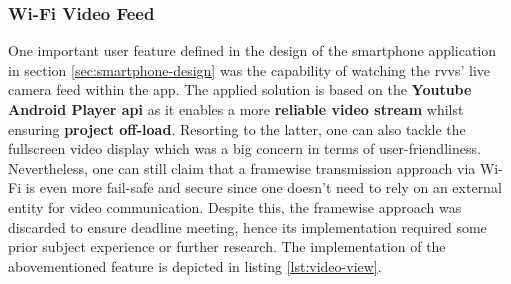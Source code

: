 \subsubsection{Wi-Fi Video Feed}
\label{sec:wifi-implem-video}
%
One important user feature defined in the design of the smartphone application in section \ref{sec:smartphone-design} was the capability of watching the \gls{rvvs}' live camera feed within the app. The applied solution is based on the \textbf{Youtube Android Player \gls{api}} \cite{yt_api} as it enables a more \textbf{reliable video stream} whilst ensuring \textbf{project off-load}. Resorting to the latter, one can also tackle the fullscreen video display which was a big concern in terms of user-friendliness. Nevertheless, one can still claim that a framewise transmission approach via Wi-Fi is even more fail-safe and secure since one doesn't need to rely on an external entity for video communication.
Despite this, the framewise approach was discarded to ensure deadline meeting, hence its implementation required some prior subject experience or further research. The implementation of the abovementioned feature is depicted in listing \ref{lst:video-view}.\\
%

%
